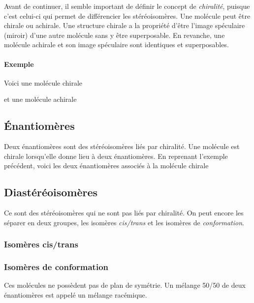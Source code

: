 Avant de continuer, il semble important de définir le concept de \emph{chiralité},
puisque c'est celui-ci qui permet de différencier les stéréoisomères.
Une molécule peut être chirale ou achirale.
Une structure chirale a la propriété d'être l'image spéculaire (miroir) d'une autre molécule sans y être superposable.
En revanche, une molécule achirale et son image spéculaire sont identiques et superposables.

\paragraph{Exemple}
Voici une molécule chirale
\begin{center}
\end{center}  
et une molécule achirale
\begin{center}
\end{center}

\subsection{Énantiomères}
Deux énantiomères sont des stéréoisomères liés par chiralité. 
Une molécule est chirale lorsqu'elle donne lieu à deux énantiomères.
En reprenant l'exemple précédent, 
voici les deux énantiomères associés à la molécule chirale
\begin{center}
  \qquad
\end{center}

\subsection{Diastéréoisomères}
Ce sont des stéréoisomères qui ne sont pas liés par chiralité.
On peut encore les séparer en deux groupes, 
les isomères \emph{cis/trans} et les isomères de \emph{conformation}.

\subsubsection{Isomères cis/trans}
\subsubsection{Isomères de conformation}
Ces molécules ne possèdent pas de plan de symétrie.
Un mélange 50/50 de deux énantiomères est appelé un mélange racémique.

